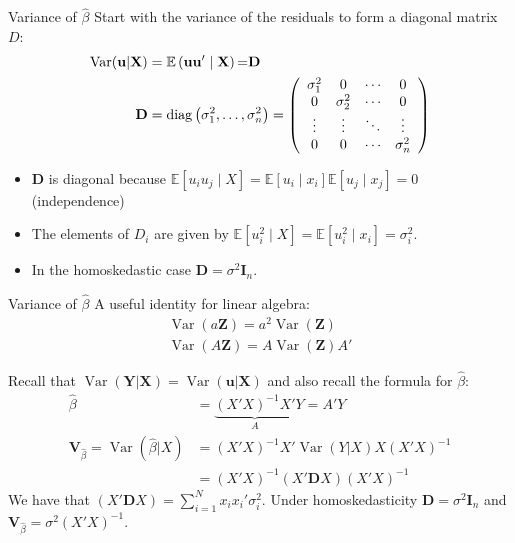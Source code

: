 \documentclass[aspectratio=169]{beamer}
\begin{document}
\begin{frame}{Variance of $\widehat{\beta}$}
Start with the variance of the residuals to form a \alert{diagonal} matrix $D$:
\begin{align*}
\operatorname { Var } ( \mathbf{u} | \mathbf { X } ) &= \mathbb { E } \left( \mathbf{u u} ^ { \prime } \mid \mathbf { X } \right){ = } \mathbf { D }\\
\mathbf { D } &= \operatorname { diag } \left( \sigma _ { 1 } ^ { 2 } , \ldots , \sigma _ { n } ^ { 2 } \right) = \left( \begin{array} { c c c c } { \sigma _ { 1 } ^ { 2 } } & { 0 } & { \cdots } & { 0 } \\ { 0 } & { \sigma _ { 2 } ^ { 2 } } & { \cdots } & { 0 } \\ { \vdots } & { \vdots } & { \ddots } & { \vdots } \\ { 0 } & { 0 } & { \cdots } & { \sigma _ { n } ^ { 2 } } \end{array} \right)
\end{align*}
\begin{itemize}
\item $\mathbf{D}$ is diagonal because $\mathbb { E }[u_i u_j \mid  X] = \mathbb { E }[u_i  \mid x_i]  \mathbb { E }[u_j  \mid  x_j]=0$ (independence)
\item The elements of $D_i$ are given by $\mathbb { E }[u_i^2 \mid  X] = \mathbb { E }[u_i^2 \mid x_i] = \sigma_i^2$.
\item In the \alert{homoskedastic} case $\mathbf{D} = \sigma^2 \mathbf{I}_n$.
\end{itemize}
\end{frame}

\begin{frame}{Variance of $\widehat{\beta}$}
A useful identity for linear algebra:
\begin{align*}
\operatorname { Var } (a \mathbf{Z} ) = a^2 \operatorname { Var }(\mathbf{Z})\\
\operatorname { Var } (A \mathbf{Z} ) = A \operatorname { Var }(\mathbf{Z}) A'
\end{align*}

Recall that $\operatorname { Var } ( \mathbf{Y} |\mathbf{X} )  = \operatorname { Var } ( \mathbf{u} | \mathbf { X } ) $ and also
recall the formula for $\widehat{\beta}$:
\begin{align*}
\widehat{\beta} &= \underbrace{(X'X)^{-1} X' }_{A} Y= A' Y \\
\mathbf{V}_{\widehat{\beta}} = \operatorname { Var }(\widehat{\beta} | X)&= (X'X)^{-1} X'  \operatorname { Var }(Y| X) X (X'X)^{-1} \\
													     &= (X'X)^{-1} (X'  \mathbf{D} X) (X'X)^{-1} 
\end{align*}
We have that $ (X'  \mathbf{D} X)  = \sum_{i=1}^N x_i x_i'\sigma_i^2$. Under homoskedasticity $\mathbf{D} = \sigma^2 \mathbf{I}_n$ and $\mathbf{V}_{\widehat{\beta}} = \sigma^2 (X'X)^{-1}$.
\end{frame}
\end{document}
